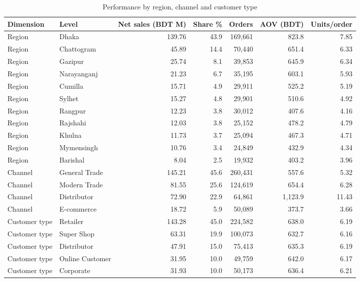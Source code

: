 \begin{table}[htbp]
\centering
\footnotesize
\caption{Performance by region, channel and customer type}
\label{tab:segments}
\begin{adjustbox}{max width=\linewidth}
\begin{tabular}{llrrrrr}
\toprule
\textbf{Dimension} & \textbf{Level} & \textbf{Net sales (BDT M)} & \textbf{Share \%} & \textbf{Orders} & \textbf{AOV (BDT)} & \textbf{Units/order} \\
\midrule
Region & Dhaka & 139.76 & 43.9 & 169,661 & 823.8 & 7.85 \\
Region & Chattogram & 45.89 & 14.4 & 70,440 & 651.4 & 6.33 \\
Region & Gazipur & 25.74 & 8.1 & 39,853 & 645.9 & 6.34 \\
Region & Narayanganj & 21.23 & 6.7 & 35,195 & 603.1 & 5.93 \\
Region & Cumilla & 15.71 & 4.9 & 29,911 & 525.2 & 5.19 \\
Region & Sylhet & 15.27 & 4.8 & 29,901 & 510.6 & 4.92 \\
Region & Rangpur & 12.23 & 3.8 & 30,012 & 407.6 & 4.16 \\
Region & Rajshahi & 12.03 & 3.8 & 25,152 & 478.2 & 4.79 \\
Region & Khulna & 11.73 & 3.7 & 25,094 & 467.3 & 4.71 \\
Region & Mymensingh & 10.76 & 3.4 & 24,849 & 432.9 & 4.34 \\
Region & Barishal & 8.04 & 2.5 & 19,932 & 403.2 & 3.96 \\
Channel & General Trade & 145.21 & 45.6 & 260,431 & 557.6 & 5.32 \\
Channel & Modern Trade & 81.55 & 25.6 & 124,619 & 654.4 & 6.28 \\
Channel & Distributor & 72.90 & 22.9 & 64,861 & 1,123.9 & 11.43 \\
Channel & E-commerce & 18.72 & 5.9 & 50,089 & 373.7 & 3.66 \\
Customer type & Retailer & 143.28 & 45.0 & 224,582 & 638.0 & 6.19 \\
Customer type & Super Shop & 63.31 & 19.9 & 100,073 & 632.7 & 6.16 \\
Customer type & Distributor & 47.91 & 15.0 & 75,413 & 635.3 & 6.19 \\
Customer type & Online Customer & 31.95 & 10.0 & 49,759 & 642.0 & 6.17 \\
Customer type & Corporate & 31.93 & 10.0 & 50,173 & 636.4 & 6.21 \\
\bottomrule
\end{tabular}
\end{adjustbox}
\end{table}